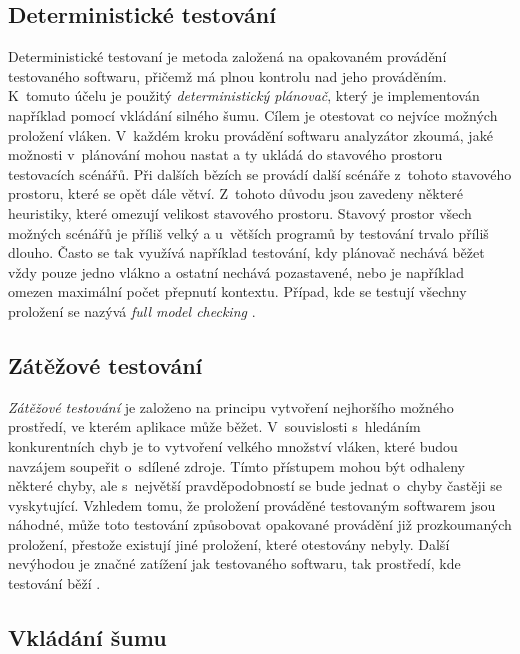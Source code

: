 \subsection{Deterministické testování}

Deterministické testovaní je metoda založená na opakovaném provádění testovaného softwaru, přičemž má plnou kontrolu nad jeho prováděním. K~tomuto účelu je použitý \textit{deterministický plánovač}, který je implementován například pomocí vkládání silného šumu. Cílem je otestovat co nejvíce možných proložení vláken. V~každém kroku provádění softwaru analyzátor zkoumá, jaké možnosti v~plánování mohou nastat a ty ukládá do stavového prostoru testovacích scénářů. Při dalších bězích se provádí další scénáře z~tohoto stavového prostoru, které se opět dále větví. Z~tohoto důvodu jsou zavedeny některé heuristiky, které omezují velikost stavového prostoru. Stavový prostor všech možných scénářů je příliš velký a u~větších programů by testování trvalo příliš dlouho. Často se tak využívá například testování, kdy plánovač nechává běžet vždy pouze jedno vlákno a ostatní nechává pozastavené, nebo je například omezen maximální počet přepnutí kontextu. Případ, kde se testují všechny proložení se nazývá \textit{full model checking} \cite{cite:advances}.

\subsection{Zátěžové testování}

\textit{Zátěžové testování} je založeno na principu vytvoření nejhoršího možného prostředí, ve kterém aplikace může běžet. V~souvislosti s~hledáním konkurentních chyb je to vytvoření velkého množství vláken, které budou navzájem soupeřit o~sdílené zdroje. Tímto přístupem mohou být odhaleny některé chyby, ale s~největší pravděpodobností se bude jednat o~chyby častěji se vyskytující. Vzhledem tomu, že proložení prováděné testovaným softwarem jsou náhodné, může toto testování způsobovat opakované provádění již prozkoumaných proložení, přestože existují jiné proložení, které otestovány nebyly. Další nevýhodou je značné zatížení jak testovaného softwaru, tak prostředí, kde testování běží \cite{cite:advances}.

\subsection{Vkládání šumu}

